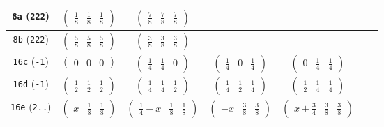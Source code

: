 \documentclass[fleqn,9pt,landscape]{jsarticle}
\begin{document}
\begin{center}
\begin{longtable}{ccccccc}
{\tt 8a} ({\tt 222}) & $ \begin{pmatrix} \frac{1}{8} & \frac{1}{8} & \frac{1}{8} \end{pmatrix} $ & $ \begin{pmatrix} \frac{7}{8} & \frac{7}{8} & \frac{7}{8} \end{pmatrix} $ & $  $ & $  $ & $  $ & $  $ \\ \hline
{\tt 8b} ({\tt 222}) & $ \begin{pmatrix} \frac{5}{8} & \frac{5}{8} & \frac{5}{8} \end{pmatrix} $ & $ \begin{pmatrix} \frac{3}{8} & \frac{3}{8} & \frac{3}{8} \end{pmatrix} $ & $  $ & $  $ & $  $ & $  $ \\ \hline
{\tt 16c} ({\tt -1}) & $ \begin{pmatrix} 0 & 0 & 0 \end{pmatrix} $ & $ \begin{pmatrix} \frac{1}{4} & \frac{1}{4} & 0 \end{pmatrix} $ & $ \begin{pmatrix} \frac{1}{4} & 0 & \frac{1}{4} \end{pmatrix} $ & $ \begin{pmatrix} 0 & \frac{1}{4} & \frac{1}{4} \end{pmatrix} $ & $  $ & $  $ \\ \hline
{\tt 16d} ({\tt -1}) & $ \begin{pmatrix} \frac{1}{2} & \frac{1}{2} & \frac{1}{2} \end{pmatrix} $ & $ \begin{pmatrix} \frac{1}{4} & \frac{1}{4} & \frac{1}{2} \end{pmatrix} $ & $ \begin{pmatrix} \frac{1}{4} & \frac{1}{2} & \frac{1}{4} \end{pmatrix} $ & $ \begin{pmatrix} \frac{1}{2} & \frac{1}{4} & \frac{1}{4} \end{pmatrix} $ & $  $ & $  $ \\ \hline
{\tt 16e} ({\tt 2..}) & $ \begin{pmatrix} x & \frac{1}{8} & \frac{1}{8} \end{pmatrix} $ & $ \begin{pmatrix} \frac{1}{4} - x & \frac{1}{8} & \frac{1}{8} \end{pmatrix} $ & $ \begin{pmatrix} - x & \frac{3}{8} & \frac{3}{8} \end{pmatrix} $ & $ \begin{pmatrix} x + \frac{3}{4} & \frac{3}{8} & \frac{3}{8} \end{pmatrix} $ & $  $ & $  $ \\ \hline

\end{longtable}
\end{center}
\end{document}
